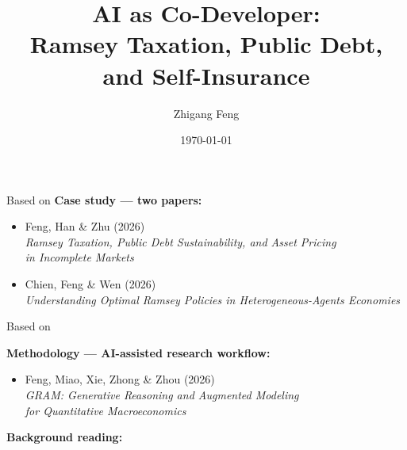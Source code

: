 \documentclass[10pt,aspectratio=169]{beamer}
\title[AI as Co-Developer]{AI as Co-Developer:\\
  Ramsey Taxation, Public Debt, and Self-Insurance}
\author[Feng]{Zhigang Feng}
\institute{University of Nebraska Omaha}
\date{\today}
\newcommand{\zh}[1]{\begin{CJK}{UTF8}{gbsn}#1\end{CJK}}
\begin{document}
\begin{frame}[plain]
  \titlepage
\end{frame}

\begin{frame}{Based on}
\vspace{0.5em}
\textbf{Case study --- two papers:}
\vspace{0.8em}

\begin{itemize}\setlength\itemsep{1.0em}
  \item Feng, Han \& Zhu (2026)\\
    \emph{Ramsey Taxation, Public Debt Sustainability, and Asset Pricing\\
    in Incomplete Markets}

  \item Chien, Feng \& Wen (2026)\\
    \emph{Understanding Optimal Ramsey Policies in Heterogeneous-Agents Economies}
\end{itemize}

\end{frame}

\begin{frame}{Based on}
  
\vspace{1.2em}
\textbf{Methodology --- AI-assisted research workflow:}
\vspace{0.8em}

\begin{itemize}
  \item Feng, Miao, Xie, Zhong \& Zhou (2026)\\
    \emph{GRAM: Generative Reasoning and Augmented Modeling\\
    for Quantitative Macroeconomics}
\end{itemize}

\vspace{1.0em}
\textbf{Background reading:}
\vspace{0.5em}

\end{frame}
\end{document}
